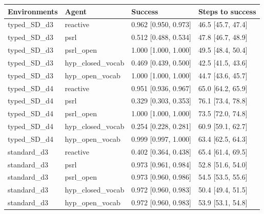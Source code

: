 \begin{tabular}{llll}
\toprule
Environments & Agent & Success & Steps to success \\
\midrule
typed\_SD\_d3 & reactive & 0.962 [0.950, 0.973] & 46.5 [45.7, 47.4] \\
typed\_SD\_d3 & psrl & 0.512 [0.488, 0.534] & 47.8 [46.7, 48.9] \\
typed\_SD\_d3 & psrl\_open & 1.000 [1.000, 1.000] & 49.5 [48.4, 50.4] \\
typed\_SD\_d3 & hyp\_closed\_vocab & 0.469 [0.439, 0.500] & 42.5 [41.5, 43.6] \\
typed\_SD\_d3 & hyp\_open\_vocab & 1.000 [1.000, 1.000] & 44.7 [43.6, 45.7] \\
typed\_SD\_d4 & reactive & 0.951 [0.936, 0.967] & 65.0 [64.2, 65.9] \\
typed\_SD\_d4 & psrl & 0.329 [0.303, 0.353] & 76.1 [73.4, 78.8] \\
typed\_SD\_d4 & psrl\_open & 1.000 [1.000, 1.000] & 73.5 [72.0, 74.8] \\
typed\_SD\_d4 & hyp\_closed\_vocab & 0.254 [0.228, 0.281] & 60.9 [59.1, 62.7] \\
typed\_SD\_d4 & hyp\_open\_vocab & 0.999 [0.997, 1.000] & 63.4 [62.5, 64.3] \\
standard\_d3 & reactive & 0.402 [0.364, 0.438] & 65.4 [61.4, 69.5] \\
standard\_d3 & psrl & 0.973 [0.961, 0.984] & 52.8 [51.6, 54.0] \\
standard\_d3 & psrl\_open & 0.973 [0.960, 0.986] & 54.5 [53.5, 55.6] \\
standard\_d3 & hyp\_closed\_vocab & 0.972 [0.960, 0.983] & 50.4 [49.4, 51.5] \\
standard\_d3 & hyp\_open\_vocab & 0.972 [0.960, 0.983] & 53.9 [53.1, 54.8] \\
\bottomrule
\end{tabular}
